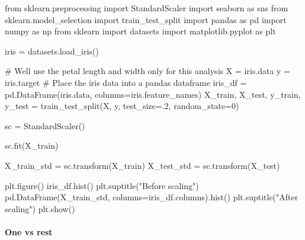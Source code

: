 \documentclass[
  letterpaper,
  DIV=11,
  numbers=noendperiod]{scrartcl}
\let\oldparagraph\paragraph
\renewcommand{\paragraph}[1]{\oldparagraph{#1}\mbox{}}
\newenvironment{Shaded}{\begin{snugshade}}{\end{snugshade}}
\newcommand{\CommentTok}[1]{\textcolor[rgb]{0.37,0.37,0.37}{#1}}
\newcommand{\DecValTok}[1]{\textcolor[rgb]{0.68,0.00,0.00}{#1}}
\newcommand{\FloatTok}[1]{\textcolor[rgb]{0.68,0.00,0.00}{#1}}
\newcommand{\ImportTok}[1]{\textcolor[rgb]{0.00,0.46,0.62}{#1}}
\newcommand{\NormalTok}[1]{\textcolor[rgb]{0.00,0.23,0.31}{#1}}
\newcommand{\OperatorTok}[1]{\textcolor[rgb]{0.37,0.37,0.37}{#1}}
\newcommand{\StringTok}[1]{\textcolor[rgb]{0.13,0.47,0.30}{#1}}
\begin{document}
\begin{Shaded}
\begin{Highlighting}[]
\ImportTok{from}\NormalTok{ sklearn.preprocessing }\ImportTok{import}\NormalTok{ StandardScaler}
\ImportTok{import}\NormalTok{ seaborn }\ImportTok{as}\NormalTok{ sns}
\ImportTok{from}\NormalTok{ sklearn.model\_selection }\ImportTok{import}\NormalTok{ train\_test\_split}
\ImportTok{import}\NormalTok{ pandas }\ImportTok{as}\NormalTok{ pd}
\ImportTok{import}\NormalTok{ numpy }\ImportTok{as}\NormalTok{ np}
\ImportTok{from}\NormalTok{ sklearn }\ImportTok{import}\NormalTok{ datasets}
\ImportTok{import}\NormalTok{ matplotlib.pyplot }\ImportTok{as}\NormalTok{ plt}

\NormalTok{iris }\OperatorTok{=}\NormalTok{ datasets.load\_iris()}

\CommentTok{\# We\textquotesingle{}ll use the petal length and width only for this analysis}
\NormalTok{X }\OperatorTok{=}\NormalTok{ iris.data}
\NormalTok{y }\OperatorTok{=}\NormalTok{ iris.target}
\CommentTok{\# Place the iris data into a pandas dataframe}
\NormalTok{iris\_df }\OperatorTok{=}\NormalTok{ pd.DataFrame(iris.data, columns}\OperatorTok{=}\NormalTok{iris.feature\_names)}
\NormalTok{X\_train, X\_test, y\_train, y\_test }\OperatorTok{=}\NormalTok{ train\_test\_split(X, y, test\_size}\OperatorTok{=}\FloatTok{.2}\NormalTok{, random\_state}\OperatorTok{=}\DecValTok{0}\NormalTok{)}

\NormalTok{sc }\OperatorTok{=}\NormalTok{ StandardScaler()}

\NormalTok{sc.fit(X\_train)}

\NormalTok{X\_train\_std }\OperatorTok{=}\NormalTok{ sc.transform(X\_train)}
\NormalTok{X\_test\_std }\OperatorTok{=}\NormalTok{ sc.transform(X\_test)}

\NormalTok{plt.figure()}
\NormalTok{iris\_df.hist()}
\NormalTok{plt.suptitle(}\StringTok{"Before scaling"}\NormalTok{)}
\NormalTok{pd.DataFrame(X\_train\_std, columns}\OperatorTok{=}\NormalTok{iris\_df.columns).hist()}
\NormalTok{plt.suptitle(}\StringTok{"After scaling"}\NormalTok{)}
\NormalTok{plt.show()}
\end{Highlighting}
\end{Shaded}

\paragraph{One vs rest}\label{one-vs-rest}
\end{document}
